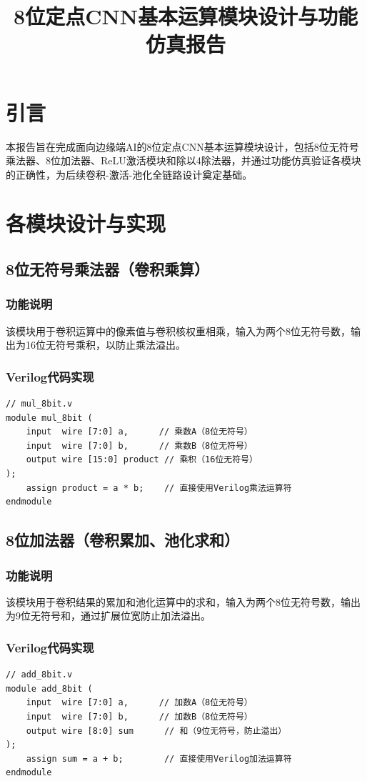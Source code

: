 \documentclass{ctexart}
\title{8位定点CNN基本运算模块设计与功能仿真报告}
\author{}
\date{}
\begin{document}
\maketitle

\section{引言}
本报告旨在完成面向边缘端AI的8位定点CNN基本运算模块设计，包括8位无符号乘法器、8位加法器、ReLU激活模块和除以4除法器，并通过功能仿真验证各模块的正确性，为后续卷积-激活-池化全链路设计奠定基础。

\section{各模块设计与实现}

\subsection{8位无符号乘法器（卷积乘算）}
\subsubsection{功能说明}
该模块用于卷积运算中的像素值与卷积核权重相乘，输入为两个8位无符号数，输出为16位无符号乘积，以防止乘法溢出。

\subsubsection{Verilog代码实现}
\begin{lstlisting}[style=verilog, caption=mul\_8bit.v]
// mul_8bit.v
module mul_8bit (
    input  wire [7:0] a,      // 乘数A（8位无符号）
    input  wire [7:0] b,      // 乘数B（8位无符号）
    output wire [15:0] product // 乘积（16位无符号）
);
    assign product = a * b;    // 直接使用Verilog乘法运算符
endmodule
\end{lstlisting}

\subsection{8位加法器（卷积累加、池化求和）}
\subsubsection{功能说明}
该模块用于卷积结果的累加和池化运算中的求和，输入为两个8位无符号数，输出为9位无符号和，通过扩展位宽防止加法溢出。

\subsubsection{Verilog代码实现}
\begin{lstlisting}[style=verilog, caption=add\_8bit.v]
// add_8bit.v
module add_8bit (
    input  wire [7:0] a,      // 加数A（8位无符号）
    input  wire [7:0] b,      // 加数B（8位无符号）
    output wire [8:0] sum      // 和（9位无符号，防止溢出）
);
    assign sum = a + b;        // 直接使用Verilog加法运算符
endmodule
\end{lstlisting}
\end{document}
